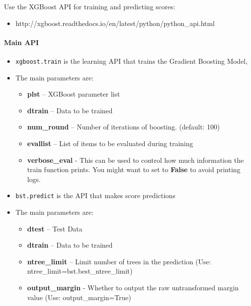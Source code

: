 \documentclass[11pt]{article}
\providecommand{\tightlist}{%
      \setlength{\itemsep}{0pt}\setlength{\parskip}{0pt}}
\begin{document}
    Use the XGBoost API for training and predicting scores:

\begin{itemize}
\tightlist
\item
  http://xgboost.readthedocs.io/en/latest/python/python\_api.html
\end{itemize}

\paragraph{Main API}\label{main-api}

\begin{itemize}
\tightlist
\item
  \texttt{xgboost.train} is the learning API that trains the Gradient
  Boosting Model,
\item
  The main parameters are:

  \begin{itemize}
  \tightlist
  \item
    \textbf{plst} -- XGBoost parameter list
  \item
    \textbf{dtrain} -- Data to be trained
  \item
    \textbf{num\_round} -- Number of iterations of boosting. (default:
    100)
  \item
    \textbf{evallist} -- List of items to be evaluated during training
  \item
    \textbf{verbose\_eval} - This can be used to control how much
    information the train function prints. You might want to set to
    \textbf{False} to avoid printing logs.
  \end{itemize}
\item
  \texttt{bst.predict} is the API that makes score predictions
\item
  The main parameters are:

  \begin{itemize}
  \tightlist
  \item
    \textbf{dtest} -- Test Data
  \item
    \textbf{dtrain} -- Data to be trained
  \item
    \textbf{ntree\_limit} -- Limit number of trees in the prediction
    (Use: ntree\_limit=bst.best\_ntree\_limit)
  \item
    \textbf{output\_margin} - Whether to output the raw untransformed
    margin value (Use: output\_margin=True)
  \end{itemize}
\end{itemize}
\end{document}
